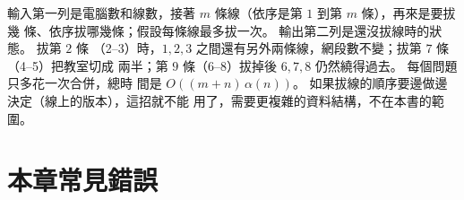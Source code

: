 
輸入第一列是電腦數和線數，接著 $m$ 條線（依序是第 $1$ 到第 $m$ 條），再來是要拔幾
條、依序拔哪幾條；假設每條線最多拔一次。 輸出第二列是還沒拔線時的狀態。 拔第 $2$ 條
（2--3）時，$1, 2, 3$ 之間還有另外兩條線，網段數不變；拔第 $7$ 條（4--5）把教室切成
兩半；第 $9$ 條（6--8）拔掉後 $6, 7, 8$ 仍然繞得過去。 每個問題只多花一次合併，總時
間是 $O((m + n)\,\alpha(n))$。 如果拔線的順序要邊做邊決定（線上的版本），這招就不能
用了，需要更複雜的資料結構，不在本書的範圍。

\section{本章常見錯誤}
\label{sec:ds-pitfalls}

